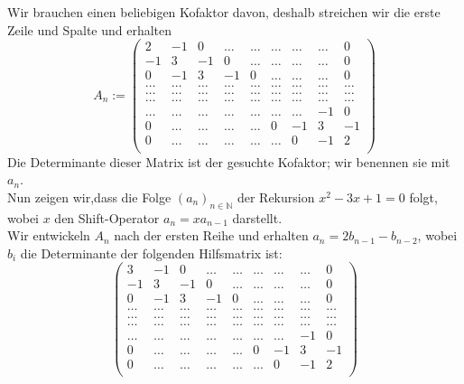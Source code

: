 Wir brauchen einen beliebigen Kofaktor davon, deshalb streichen wir die erste Zeile und Spalte und erhalten\\
\begin{equation}
A_n:=
\begin{pmatrix}
2&-1&0&\ldots&\ldots&\ldots&\ldots&\ldots&0\\
-1&3&-1&0&\ldots&\ldots&\ldots&\ldots&0\\
0&-1&3&-1&0&\ldots&\ldots&\ldots&0\\
\ldots&\ldots&\ldots&\ldots&\ldots&\ldots&\ldots&\ldots&\ldots\\
\ldots&\ldots&\ldots&\ldots&\ldots&\ldots&\ldots&\ldots&\ldots\\
\ldots&\ldots&\ldots&\ldots&\ldots&\ldots&\ldots&\ldots&\ldots\\
\ldots&\ldots&\ldots&\ldots&\ldots&\ldots&\ldots&-1&0\\
0&\ldots&\ldots&\ldots&\ldots&0&-1&3&-1\\
0&\ldots&\ldots&\ldots&\ldots&\ldots&0&-1&2\\
\end{pmatrix}
\end{equation}
Die Determinante dieser Matrix ist der gesuchte Kofaktor; wir benennen sie mit $a_n$.\\
Nun zeigen wir,dass die Folge $(a_n)_{n \in \mathbb{N}}$ der Rekursion $x^2-3x+1=0$ folgt, \\wobei $x$ den Shift-Operator $a_n = xa_{n-1}$ darstellt. \\
Wir entwickeln $A_n$ nach der ersten Reihe und erhalten $a_n = 2b_{n-1} - b_{n-2}$, wobei $b_i$ die Determinante der folgenden Hilfsmatrix ist:\\
\begin{equation}
\begin{pmatrix}
3&-1&0&\ldots&\ldots&\ldots&\ldots&\ldots&0\\
-1&3&-1&0&\ldots&\ldots&\ldots&\ldots&0\\
0&-1&3&-1&0&\ldots&\ldots&\ldots&0\\
\ldots&\ldots&\ldots&\ldots&\ldots&\ldots&\ldots&\ldots&\ldots\\
\ldots&\ldots&\ldots&\ldots&\ldots&\ldots&\ldots&\ldots&\ldots\\
\ldots&\ldots&\ldots&\ldots&\ldots&\ldots&\ldots&\ldots&\ldots\\
\ldots&\ldots&\ldots&\ldots&\ldots&\ldots&\ldots&-1&0\\
0&\ldots&\ldots&\ldots&\ldots&0&-1&3&-1\\
0&\ldots&\ldots&\ldots&\ldots&\ldots&0&-1&2\\
\end{pmatrix}
\end{equation}
